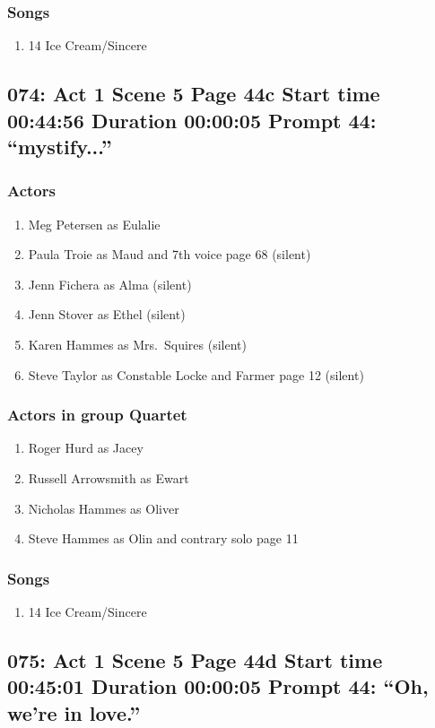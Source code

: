\subsubsection{Songs}
\begin{enumerate}
\item 14 Ice Cream/Sincere
\end{enumerate}
\subsection{074: Act 1 Scene 5 Page 44c Start time 00:44:56 Duration 00:00:05 Prompt 44: ``mystify...''}

\subsubsection{Actors}
\begin{enumerate}
\item Meg Petersen as Eulalie
\item Paula Troie as Maud and 7th voice page 68 (silent)
\item Jenn Fichera as Alma (silent)
\item Jenn Stover as Ethel (silent)
\item Karen Hammes as Mrs.~Squires (silent)
\item Steve Taylor as Constable Locke and Farmer page 12 (silent)
\end{enumerate}
\subsubsection{Actors in group Quartet}
\begin{enumerate}
\item Roger Hurd as Jacey
\item Russell Arrowsmith as Ewart
\item Nicholas Hammes as Oliver
\item Steve Hammes as Olin and contrary solo page 11
\end{enumerate}

\subsubsection{Songs}
\begin{enumerate}
\item 14 Ice Cream/Sincere
\end{enumerate}
\subsection{075: Act 1 Scene 5 Page 44d Start time 00:45:01 Duration 00:00:05 Prompt 44: ``Oh, we're in love.''}

